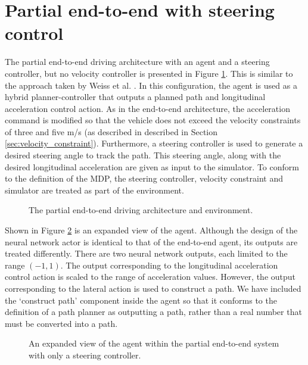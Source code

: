 \section{Partial end-to-end with steering control}
The partial end-to-end driving architecture with an agent and a steering controller, but no velocity controller is presented in Figure \ref{fig:partial_end_to_end_architecture_steer}. 
This is similar to the approach taken by Weiss et al. \cite{Weiss2020}.
In this configuration, the agent is used as a hybrid planner-controller that outputs a planned path and longitudinal acceleration control action.
As in the end-to-end architecture, the acceleration command is modified so that the vehicle does not exceed the velocity constraints of three and five m/s (as described in described in Section \ref{sec:velocity_constraint}).
Furthermore, a steering controller is used to generate a desired steering angle to track the path.
This steering angle, along with the desired longitudinal acceleration are given as input to the simulator.
To conform to the definition of the MDP, the steering controller, velocity constraint and simulator are treated as part of the environment.

\begin{figure}[htb!]
    \centering
    
    \caption[The partial end-to-end driving architecture]{The partial end-to-end driving architecture and environment.}
    \label{fig:partial_end_to_end_architecture_steer}
\end{figure}

Shown in Figure \ref{fig:steer_agent} is an expanded view of the agent.
Although the design of the neural network actor is identical to that of the end-to-end agent, its outputs are treated differently.
There are two neural network outputs, each limited to the range $(-1,1)$.
The output corresponding to the longitudinal acceleration control action is scaled to the range of acceleration values.
However, the output corresponding to the lateral action is used to construct a path.
We have included the `construct path' component inside the agent so that it conforms to the definition of a path planner as outputting a path, rather than a real number that must be converted into a path.

\begin{figure}[htb!]
    \centering
    
    \caption[An expanded view of the agent within the partial end-to-end system with only a steering controller]{An expanded view of the agent within the partial end-to-end system with only a steering controller.}
    \label{fig:steer_agent}
\end{figure}


